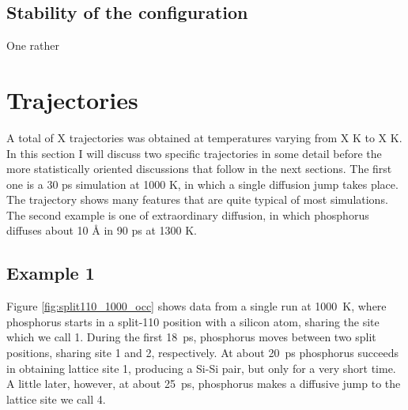 \documentclass[11pt,bibliography=totoc,index=totoc]{scrbook}   %
\begin{document}
%
\subsection{Stability of the  configuration}
%

One rather 




%
\section{Trajectories}
%




A total of X trajectories was obtained at temperatures varying from X K to X K. 
In this section I will discuss two specific trajectories in some detail before the more statistically oriented discussions that follow in the next sections.
The first one is a 30 ps simulation at 1000 K, in which a single diffusion jump takes place. 
The trajectory shows many features that are quite typical of most simulations.
The second example is one of extraordinary diffusion, in which phosphorus diffuses about 10 Å in 90 ps at 1300 K.

%
\subsection{Example 1}
%

Figure \ref{fig:split110_1000_occ} shows data from a single run at 1000~K,
where phosphorus starts in a split-110 position with a silicon atom, sharing the site which we call 1. During the first 18~ps, phosphorus moves between two split positions, sharing site 1 and 2, respectively. At about 20~ps phosphorus succeeds in obtaining lattice site 1, producing a Si-Si pair, but only for a very short time. A little later, however, at about 25~ps, phosphorus makes a diffusive jump to the lattice site we call 4. 
\end{document}
